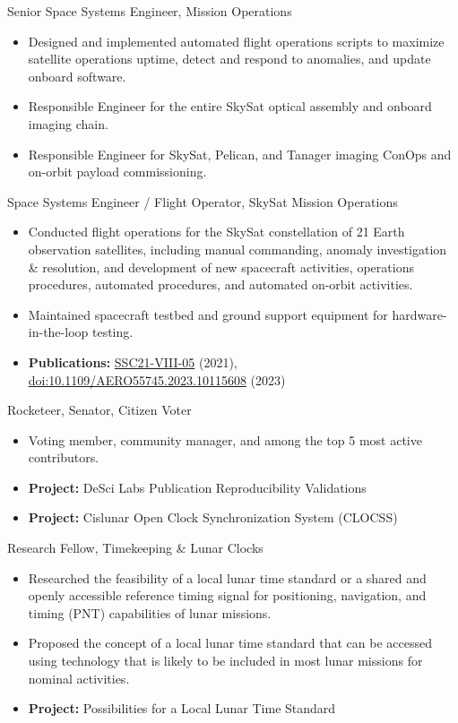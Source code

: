 \documentclass[10pt,final,sans]{resume}
\begin{document}
Senior Space Systems Engineer, Mission Operations
\begin{itemize}
    \item Designed and implemented automated flight operations scripts to maximize satellite operations uptime, detect and respond to anomalies, and update onboard software.
    \item Responsible Engineer for the entire SkySat optical assembly and onboard imaging chain.
    \item Responsible Engineer for SkySat, Pelican, and Tanager imaging ConOps and on-orbit payload commissioning.
\end{itemize}

Space Systems Engineer / Flight Operator, SkySat Mission Operations
\begin{itemize}
    \item Conducted flight operations for the SkySat constellation of 21 Earth
    observation satellites, including manual commanding, anomaly investigation \&
    resolution, and development of new spacecraft activities, operations
    procedures, automated procedures, and automated on-orbit activities.
    \item Maintained spacecraft testbed and ground support equipment for
    hardware-in-the-loop testing.
    \item {\bf Publications:} \href{https://digitalcommons.usu.edu/smallsat/2021/all2021/189/}{SSC21-VIII-05} (2021), \href{https://doi.org/10.1109/AERO55745.2023.10115608}{doi:10.1109/AERO55745.2023.10115608} (2023)
\end{itemize}

Rocketeer, Senator, Citizen Voter
\begin{itemize}
    \item Voting member, community manager, and among the top 5 most active contributors.
    \item {\bf Project:} DeSci Labs Publication Reproducibility Validations
    \item {\bf Project:} Cislunar Open Clock Synchronization System (CLOCSS)
\end{itemize}

Research Fellow, Timekeeping \& Lunar Clocks
\begin{itemize}
    \item Researched the feasibility of a local lunar time standard or a shared and openly accessible reference timing signal for positioning, navigation, and timing (PNT) capabilities of lunar missions.
    \item Proposed the concept of a local lunar time standard that can be accessed using technology that is likely to be included in most lunar missions for nominal activities.
    \item {\bf Project:} Possibilities for a Local Lunar Time Standard
\end{itemize}
\end{document}
